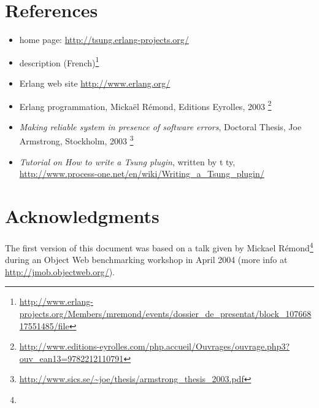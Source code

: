 \documentclass{IDXDOC-en}
\begin{document}
\section{References}

\begin{itemize}
\item {} home page: \url{http://tsung.erlang-projects.org/}
\item {} description (French)\footnote{\url{http://www.erlang-projects.org/Members/mremond/events/dossier_de_presentat/block_10766817551485/file}}
\item Erlang web site \url{http://www.erlang.org/}
\item Erlang programmation, Mickaël Rémond, Editions Eyrolles, 2003
  \footnote{\url{http://www.editions-eyrolles.com/php.accueil/Ouvrages/ouvrage.php3?ouv_ean13=9782212110791}}
\item \emph{Making reliable system in presence of software errors}, Doctoral Thesis,
Joe Armstrong, Stockholm, 2003 \footnote{\url{http://www.sics.se/~joe/thesis/armstrong_thesis_2003.pdf}}
\item \emph{Tutorial on How to write a Tsung plugin}, written by t ty, \url{http://www.process-one.net/en/wiki/Writing_a_Tsung_plugin/}
\end{itemize}

\section{Acknowledgments}

The first version of this document was based on a talk given by Mickael
Rémond\footnote{} during an Object
Web benchmarking workshop in April 2004 (more info at
\url{http://jmob.objectweb.org/}).
\end{document}
